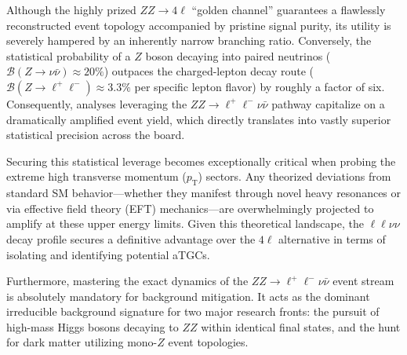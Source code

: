 Although the highly prized $ZZ \to 4\ell$ ``golden channel'' guarantees a flawlessly reconstructed event topology accompanied by pristine signal purity, its utility is severely hampered by an inherently narrow branching ratio. Conversely, the statistical probability of a $Z$ boson decaying into paired neutrinos ($\mathcal{B}(Z \to \nu\bar{\nu}) \approx 20\%$) outpaces the charged-lepton decay route ($\mathcal{B}(Z \to \ell^+\ell^-) \approx 3.3\%$ per specific lepton flavor) by roughly a factor of six.
%
Consequently, analyses leveraging the $ZZ \to \ell^+\ell^-\nu\bar\nu$ pathway capitalize on a dramatically amplified event yield, which directly translates into vastly superior statistical precision across the board.

Securing this statistical leverage becomes exceptionally critical when probing the extreme high transverse momentum ($p_{\mathrm{T}}$) sectors. Any theorized deviations from standard SM behavior—whether they manifest through novel heavy resonances or via effective field theory (EFT) mechanics—are overwhelmingly projected to amplify at these upper energy limits. Given this theoretical landscape, the $\ell\ell\nu\nu$ decay profile secures a definitive advantage over the $4\ell$ alternative in terms of isolating and identifying potential aTGCs.

Furthermore, mastering the exact dynamics of the $ZZ \to \ell^+\ell^-\nu\bar\nu$ event stream is absolutely mandatory for background mitigation. It acts as the dominant irreducible background signature for two major research fronts: the pursuit of high-mass Higgs bosons decaying to $ZZ$ within identical final states, and the hunt for dark matter utilizing mono-$Z$ event topologies.

